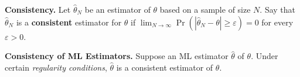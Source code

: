 \documentclass[border=3bp]{standalone}
\begin{document}
\begin{minipage}{3.5in}
\textbf{Consistency.} Let $\hat{\theta}_N$ be an estimator of $\theta$ based on a sample of size $N$. Say that $\hat{\theta}_N$ is a \textbf{consistent} estimator for $\theta$ if $\lim_{N \to \infty} \Pr \left( |\hat{\theta}_N - \theta| \ge \varepsilon \right) = 0$ for every $\varepsilon > 0$.

\vspace{4mm}

\textbf{Consistency of ML Estimators.} Suppose an ML estimator $\hat{\theta}$ of $\theta$. Under certain \textit{regularity conditions}, $\hat{\theta}$ is a consistent estimator of $\theta$.
\end{minipage}
\end{document}
